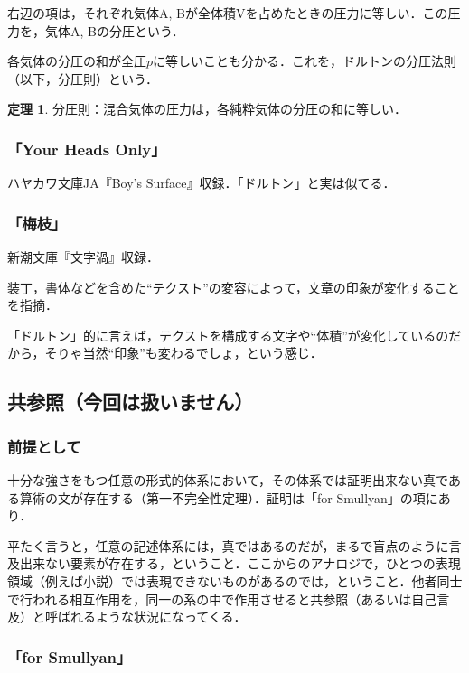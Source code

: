 \documentclass[10pt, a5paper, twoside]{jsarticle}
\theoremstyle{definition}
\newtheorem{thm}{定理}
\begin{document}
				右辺の項は，それぞれ気体A, Bが全体積Vを占めたときの圧力に等しい．この圧力を，気体A, Bの分圧という．

				各気体の分圧の和が全圧$ p $に等しいことも分かる．これを，ドルトンの分圧法則（以下，分圧則）という．

			\begin{thm}

				分圧則：混合気体の圧力は，各純粋気体の分圧の和に等しい．

			\end{thm}

			\subsubsection{「Your Heads Only」}

				ハヤカワ文庫JA『Boy's Surface』収録．「ドルトン」と実は似てる．

			\subsubsection{「梅枝」}

				新潮文庫『文字渦』収録．

				装丁，書体などを含めた“テクスト”の変容によって，文章の印象が変化することを指摘．

				「ドルトン」的に言えば，テクストを構成する文字や“体積”が変化しているのだから，そりゃ当然“印象”も変わるでしょ，という感じ．

		\subsection{共参照（今回は扱いません）}

			\subsubsection*{前提として}

				十分な強さをもつ任意の形式的体系において，その体系では証明出来ない真である算術の文が存在する（第一不完全性定理）．証明は「for Smullyan」の項にあり．

				平たく言うと，任意の記述体系には，真ではあるのだが，まるで盲点のように言及出来ない要素が存在する，ということ．ここからのアナロジで，ひとつの表現領域（例えば小説）では表現できないものがあるのでは，ということ．他者同士で行われる相互作用を，同一の系の中で作用させると共参照（あるいは自己言及）と呼ばれるような状況になってくる．

			\subsubsection{「for Smullyan」}
\end{document}
